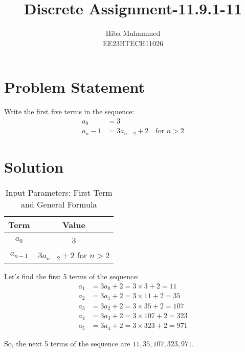 \documentclass[12pt]{article}
\begin{document}
\title{Discrete Assignment-11.9.1-11}
\author{Hiba Muhammed \\
        EE23BTECH11026}
\maketitle

\section*{Problem Statement}
Write the first five terms in the sequence:
\[
\begin{aligned}
a_0 &= 3 \\
a_n-1 &= 3a_{n-2} + 2 \quad \text{for } n > 2
\end{aligned}
\]

\section*{Solution}
\begin{table}[h]
  \centering
  \caption{Input Parameters: First Term and General Formula}
  \begin{tabular}{|c|c|}
    \hline
    \textbf{Term} & \textbf{Value} \\
    \hline
    \(a_0\) & 3 \\
    \(a_{n-1}\) & \(3a_{n-2} + 2\) for \(n > 2\) \\
    \hline
  \end{tabular}
\end{table}
Let's find the first 5 terms of the sequence:
\begin{align}
a_1 &= 3a_0 + 2 = 3 \times 3 + 2 = 11 \\a_2 &= 3a_1 + 2 = 3 \times 11 + 2 = 35 \\
a_3 &= 3a_2 + 2 = 3 \times 35 + 2 = 107 \\a_4 &= 3a_3 + 2 = 3 \times 107 + 2 = 323 \\
a_5 &= 3a_4 + 2 = 3 \times 323 + 2 = 971 
\end{align}

So, the next 5 terms of the sequence are \(11, 35, 107, 323, 971\).
\end{document}
